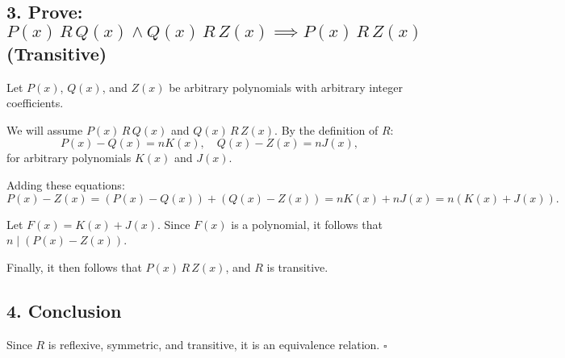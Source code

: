 \documentclass{article}
\begin{document}

\subsection*{3. Prove: $P(x) \, R \, Q(x) \land Q(x) \, R \, Z(x) \implies P(x) \, R \, Z(x)$ (Transitive)}

Let $P(x)$, $Q(x)$, and $Z(x)$ be arbitrary polynomials with arbitrary integer coefficients.

We will assume $P(x) \, R \, Q(x)$ and $Q(x) \, R \, Z(x)$. By the definition of $R$:
\[
P(x) - Q(x) = nK(x), \quad Q(x) - Z(x) = nJ(x),
\]
for arbitrary polynomials $K(x)$ and $J(x)$.

Adding these equations:
\[
P(x) - Z(x) = (P(x) - Q(x)) + (Q(x) - Z(x)) = nK(x) + nJ(x) = n(K(x) + J(x)).
\]

Let $F(x) = K(x) + J(x)$. Since $F(x)$ is a polynomial, it follows that $n \mid (P(x) - Z(x))$.

Finally, it then follows that $P(x) \, R \, Z(x)$, and $R$ is transitive.

\subsection*{4. Conclusion}

Since $R$ is reflexive, symmetric, and transitive, it is an equivalence relation. 
\(\square\) %
\end{document}
